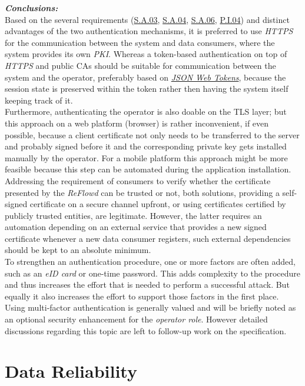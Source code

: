 \documentclass[12pt,english,a4paper,titlepage,cleardoublepage=empty,dottedtoc]{report}
\begin{document}
\emph{\textbf{Conclusions:}} ~\\
Based on the several requirements (\protect\hyperlink{sa03}{S.A.03},
\protect\hyperlink{sa04}{S.A.04}, \protect\hyperlink{sa06}{S.A.06},
\protect\hyperlink{pi04}{P.I.04}) and distinct advantages of the two
authentication mechanisms, it is preferred to use \emph{HTTPS} for the
communication between the system and data consumers, where the system
provides its own \emph{PKI}. Whereas a token-based authentication on top
of \emph{HTTPS} and public CAs should be suitable for communication
between the system and the operator, preferably based on
\emph{\protect\hyperlink{def--jwt}{JSON Web Tokens}}, because the
session state is preserved within the token rather then having the
system itself keeping track of it.\\
Furthermore, authenticating the operator is also doable on the TLS
layer; but this approach on a web platform (browser) is rather
inconvenient, if even possible, because a client certificate not only
needs to be transferred to the server and probably signed before it and
the corresponding private key gets installed manually by the operator.
For a mobile platform this approach might be more feasible because this
step can be automated during the application installation.\\
Addressing the requirement of consumers to verify whether the
certificate presented by the \emph{ReFlowd} can be trusted or not, both
solutions, providing a self-signed certificate on a secure channel
upfront, or using certificates certified by publicly trusted entities,
are legitimate. However, the latter requires an automation depending on
an external service that provides a new signed certificate whenever a
new data consumer registers, such external dependencies should be kept
to an absolute minimum.\\
To strengthen an authentication procedure, one or more factors are often
added, such as an \emph{eID card} or one-time password. This adds
complexity to the procedure and thus increases the effort that is needed
to perform a successful attack. But equally it also increases the effort
to support those factors in the first place. Using multi-factor
authentication is generally valued and will be briefly noted as an
optional security enhancement for the \emph{operator role}. However
detailed discussions regarding this topic are left to follow-up work on
the specification.

\hypertarget{data-reliability}{\section{Data
Reliability}\label{data-reliability}}
\end{document}
